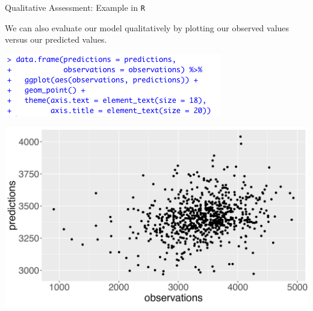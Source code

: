 \documentclass[10pt,t]{beamer}
\begin{document}
\begin{frame}{Qualitative Assessment: Example in \texttt{R}}
	\vspace{-5 mm}
	
	We can also evaluate our model qualitatively by plotting our observed values versus our predicted values.
	
	\vspace{0.3cm}
	
	\centering \includegraphics[scale=0.5]{figures/predict_vs_obs_code.png} \vspace{0.1cm}
	
	\includegraphics[scale=0.35]{figures/predict_vs_obs.png}
	
\end{frame}
\end{document}
